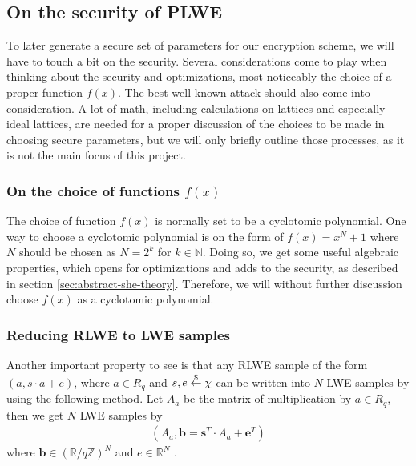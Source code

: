 \documentclass[../main.tex]{subfiles}
\begin{document}
\subsection{On the security of PLWE}
    To later generate a secure set of parameters for our encryption scheme, we will have to touch a bit on the security.
    Several considerations come to play when thinking about the security and optimizations, most noticeably the choice
    of a proper function $f(x)$. The best well-known attack should also come into consideration.
    A lot of math, including calculations on lattices and especially ideal lattices, are needed for a proper discussion of the
    choices to be made in choosing secure parameters, but we will only briefly outline those processes, as it is not the main focus of this project.

    \subsubsection{On the choice of functions $f(x)$}
        The choice of function $f(x)$ is normally set to be a cyclotomic polynomial. One way to choose a cyclotomic polynomial is on the form of $f(x) = x^N + 1$ where $N$ should be chosen as $N = 2^k$ for $k \in \mathbb{N}$.
        Doing so, we get some useful algebraic properties, which opens for optimizations and adds to the security, as described in section \ref{sec:abstract-she-theory}.
        Therefore, we will without further discussion choose $f(x)$ as a cyclotomic polynomial.

    \subsubsection{Reducing RLWE to LWE samples}
        Another important property to see is that any RLWE sample of the form $(a, s \cdot a + e)$,
		where $a \in R_q$ and $s, e \overset{\$}{\gets}{} \chi$ can be written into $N$ LWE samples by using the following method.
        Let $A_a$ be the matrix of multiplication by $a \in R_q$, then we get $N$ LWE samples by
        \begin{align*}
            (A_a, \textbf{b} = \textbf{s}^T \cdot A_a + \textbf{e}^T)
        \end{align*}
        where $\textbf{b} \in (\mathbb{R} / q\mathbb{Z})^N$ and $e \in \mathbb{R}^N$ \cite{peikert2016not}.
\end{document}
